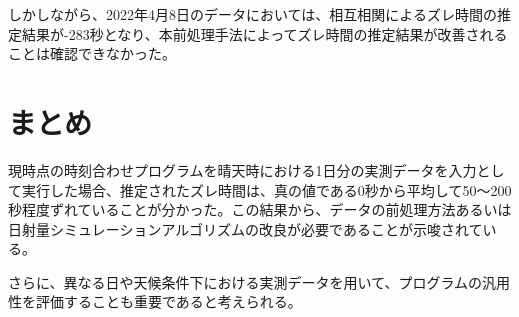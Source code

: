 \documentclass[a4j,12pt,]{jarticle}
\begin{document}
しかしながら、2022年4月8日のデータにおいては、相互相関によるズレ時間の推定結果が-283秒となり、本前処理手法によってズレ時間の推定結果が改善されることは確認できなかった。

\section{まとめ}
現時点の時刻合わせプログラムを晴天時における1日分の実測データを入力として実行した場合、推定されたズレ時間は、真の値である0秒から平均して50〜200秒程度ずれていることが分かった。この結果から、データの前処理方法あるいは日射量シミュレーションアルゴリズムの改良が必要であることが示唆されている。

さらに、異なる日や天候条件下における実測データを用いて、プログラムの汎用性を評価することも重要であると考えられる。
\end{document}
